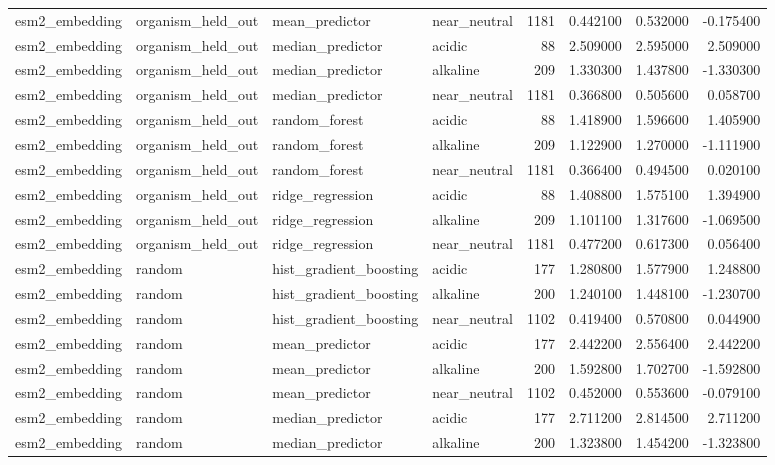 \begin{longtable}{llllrrrr}
esm2\_embedding & organism\_held\_out & mean\_predictor & near\_neutral & 1181 & 0.442100 & 0.532000 & -0.175400 \\
esm2\_embedding & organism\_held\_out & median\_predictor & acidic & 88 & 2.509000 & 2.595000 & 2.509000 \\
esm2\_embedding & organism\_held\_out & median\_predictor & alkaline & 209 & 1.330300 & 1.437800 & -1.330300 \\
esm2\_embedding & organism\_held\_out & median\_predictor & near\_neutral & 1181 & 0.366800 & 0.505600 & 0.058700 \\
esm2\_embedding & organism\_held\_out & random\_forest & acidic & 88 & 1.418900 & 1.596600 & 1.405900 \\
esm2\_embedding & organism\_held\_out & random\_forest & alkaline & 209 & 1.122900 & 1.270000 & -1.111900 \\
esm2\_embedding & organism\_held\_out & random\_forest & near\_neutral & 1181 & 0.366400 & 0.494500 & 0.020100 \\
esm2\_embedding & organism\_held\_out & ridge\_regression & acidic & 88 & 1.408800 & 1.575100 & 1.394900 \\
esm2\_embedding & organism\_held\_out & ridge\_regression & alkaline & 209 & 1.101100 & 1.317600 & -1.069500 \\
esm2\_embedding & organism\_held\_out & ridge\_regression & near\_neutral & 1181 & 0.477200 & 0.617300 & 0.056400 \\
esm2\_embedding & random & hist\_gradient\_boosting & acidic & 177 & 1.280800 & 1.577900 & 1.248800 \\
esm2\_embedding & random & hist\_gradient\_boosting & alkaline & 200 & 1.240100 & 1.448100 & -1.230700 \\
esm2\_embedding & random & hist\_gradient\_boosting & near\_neutral & 1102 & 0.419400 & 0.570800 & 0.044900 \\
esm2\_embedding & random & mean\_predictor & acidic & 177 & 2.442200 & 2.556400 & 2.442200 \\
esm2\_embedding & random & mean\_predictor & alkaline & 200 & 1.592800 & 1.702700 & -1.592800 \\
esm2\_embedding & random & mean\_predictor & near\_neutral & 1102 & 0.452000 & 0.553600 & -0.079100 \\
esm2\_embedding & random & median\_predictor & acidic & 177 & 2.711200 & 2.814500 & 2.711200 \\
esm2\_embedding & random & median\_predictor & alkaline & 200 & 1.323800 & 1.454200 & -1.323800 \\

\end{longtable}
